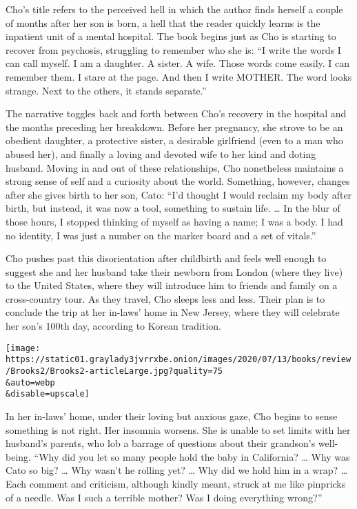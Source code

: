 Cho's title refers to the perceived hell in which the author finds
herself a couple of months after her son is born, a hell that the reader
quickly learns is the inpatient unit of a mental hospital. The book
begins just as Cho is starting to recover from psychosis, struggling to
remember who she is: ``I write the words I can call myself. I am a
daughter. A sister. A wife. Those words come easily. I can remember
them. I stare at the page. And then I write MOTHER. The word looks
strange. Next to the others, it stands separate.''

The narrative toggles back and forth between Cho's recovery in the
hospital and the months preceding her breakdown. Before her pregnancy,
she strove to be an obedient daughter, a protective sister, a desirable
girlfriend (even to a man who abused her), and finally a loving and
devoted wife to her kind and doting husband. Moving in and out of these
relationships, Cho nonetheless maintains a strong sense of self and a
curiosity about the world. Something, however, changes after she gives
birth to her son, Cato: ``I'd thought I would reclaim my body after
birth, but instead, it was now a tool, something to sustain life.
\ldots{} In the blur of those hours, I stopped thinking of myself as
having a name; I was a body. I had no identity, I was just a number on
the marker board and a set of vitals.''

Cho pushes past this disorientation after childbirth and feels well
enough to suggest she and her husband take their newborn from London
(where they live) to the United States, where they will introduce him to
friends and family on a cross-country tour. As they travel, Cho sleeps
less and less. Their plan is to conclude the trip at her in-laws' home
in New Jersey, where they will celebrate her son's 100th day, according
to Korean tradition.

\texttt{[image: https://static01.graylady3jvrrxbe.onion/images/2020/07/13/books/review/Brooks2/Brooks2-articleLarge.jpg?quality=75\\\&auto=webp\\\&disable=upscale]}

In her in-laws' home, under their loving but anxious gaze, Cho begins to
sense something is not right. Her insomnia worsens. She is unable to set
limits with her husband's parents, who lob a barrage of questions about
their grandson's well-being. ``Why did you let so many people hold the
baby in California? \ldots{} Why was Cato so big? \ldots{} Why wasn't he
rolling yet? \ldots{} Why did we hold him in a wrap? \ldots{} Each
comment and criticism, although kindly meant, struck at me like
pinpricks of a needle. Was I such a terrible mother? Was I doing
everything wrong?''

